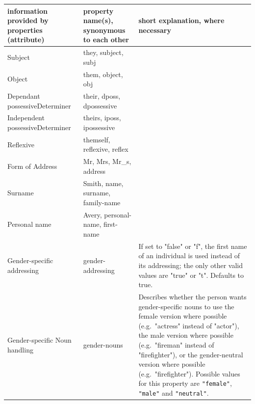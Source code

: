 \documentclass{article}
\begin{document}
    \begin{flushleft}
        \begin{center}
            \begin{longtable}{|>{\raggedright\arraybackslash}p{7em} | >{\raggedright\arraybackslash}p{9em} | >{\raggedright\arraybackslash}p{14em} |}
                 \hline
                 information provided by properties (attribute) & property name(s), \linebreak synonymous to each other & short explanation, where necessary\\
                 \hline\hline
                 Subject & they, subject, subj & \\
                 \hline
                 Object & them, object, obj & \\
                 \hline
                 Dependant possessive\linebreak Determiner & their, dposs, dpossessive & \\
                 \hline
                 Independent possessive\linebreak Determiner & theirs, iposs, ipossessive & \\
                 \hline
                 Reflexive & themself, reflexive, reflex & \\
                 \hline
                 \hline
                 Form of Address & Mr, Mrs, Mr\_s, address & \\
                 \hline
                 Surname & Smith, name, surname, family-name & \\
                 \hline
                 Personal name & Avery, personal-name, first-name & \\
                 \hline
                 \hline
                 Gender-specific addressing & gender-addressing & If set to "false" or "f", the first name of an individual is used instead of its addressing;
                 the only other valid values are "true" or "t".
                 Defaults to true.\\
                 \hline
                 Gender-specific Noun handling & gender-nouns & Describes whether the person wants gender-specific nouns to use the female version where possible (e.g.\ "actress" instead of "actor"), the male version where possible (e.g.\ "fireman" instead of "firefighter"), or the gender-neutral version where possible (e.g.\ "firefighter").
                 Possible values for this property are \texttt{"female"}, \texttt{"male"} and \texttt{"neutral"}.

\end{longtable}
\end{center}
\end{flushleft}
\end{document}
